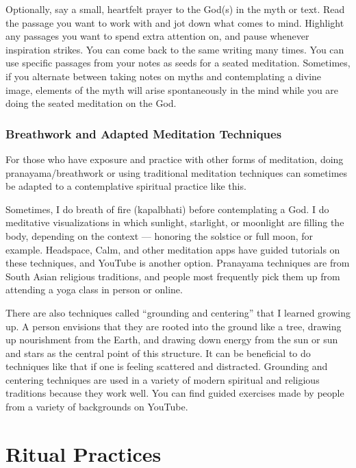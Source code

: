 \documentclass[
]{book}
\begin{document}
Optionally, say a small, heartfelt prayer to the God(s) in the myth or text. Read the passage you want to work with and jot down what comes to mind. Highlight any passages you want to spend extra attention on, and pause whenever inspiration strikes. You can come back to the same writing many times. You can use specific passages from your notes as seeds for a seated meditation. Sometimes, if you alternate between taking notes on myths and contemplating a divine image, elements of the myth will arise spontaneously in the mind while you are doing the seated meditation on the God.

\hypertarget{breathwork-and-adapted-meditation-techniques}{%
\subsubsection{Breathwork and Adapted Meditation Techniques}\label{breathwork-and-adapted-meditation-techniques}}

For those who have exposure and practice with other forms of meditation, doing pranayama/breathwork or using traditional meditation techniques can sometimes be adapted to a contemplative spiritual practice like this.

Sometimes, I do breath of fire (kapalbhati) before contemplating a God. I do meditative visualizations in which sunlight, starlight, or moonlight are filling the body, depending on the context --- honoring the solstice or full moon, for example. Headspace, Calm, and other meditation apps have guided tutorials on these techniques, and YouTube is another option. Pranayama techniques are from South Asian religious traditions, and people most frequently pick them up from attending a yoga class in person or online.

There are also techniques called ``grounding and centering'' that I learned growing up. A person envisions that they are rooted into the ground like a tree, drawing up nourishment from the Earth, and drawing down energy from the sun or sun and stars as the central point of this structure. It can be beneficial to do techniques like that if one is feeling scattered and distracted. Grounding and centering techniques are used in a variety of modern spiritual and religious traditions because they work well. You can find guided exercises made by people from a variety of backgrounds on YouTube.

\hypertarget{ritual-practices}{%
\section{Ritual Practices}\label{ritual-practices}}
\end{document}
